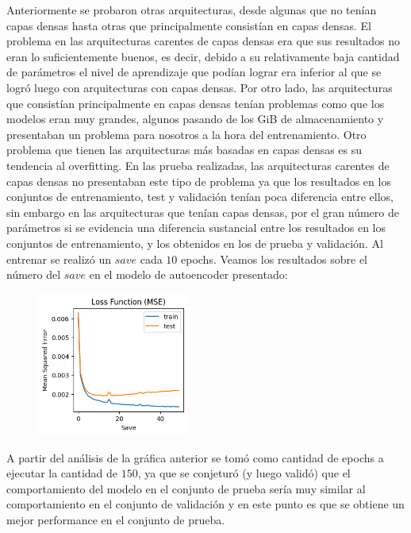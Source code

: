 \documentclass[colorinlistoftodos,twoside,twocolumn,10pt]{article} %
\begin{document}
Anteriormente se probaron otras arquitecturas, desde algunas que no tenían capas densas hasta otras que principalmente consistían en capas densas. El problema en las arquitecturas carentes de capas densas era que sus resultados no eran lo suficientemente buenos, es decir, debido a su relativamente baja cantidad de parámetros el nivel de aprendizaje que podían lograr era inferior al que se logró luego con arquitecturas con capas densas. Por otro lado, las arquitecturas que consistían principalmente en capas densas tenían problemas como que los modelos eran muy grandes, algunos pasando de los GiB de almacenamiento y presentaban un problema para nosotros a la hora del entrenamiento. Otro problema que tienen las arquitecturas más basadas en capas densas es su tendencia al overfitting. En las prueba realizadas, las arquitecturas carentes de capas densas no presentaban este tipo de problema ya que los resultados en los conjuntos de entrenamiento, test y validación tenían poca diferencia entre ellos, sin embargo en las arquitecturas que tenían capas densas, por el gran número de parámetros si se evidencia una diferencia sustancial entre los resultados en los conjuntos de entrenamiento, y los obtenidos en los de prueba y validación. Al entrenar se realizó un $save$ cada $10$ epochs. Veamos los resultados sobre el número del $save$ en el modelo de autoencoder presentado:

\begin{figure}[h!]
	\includegraphics[width=5cm]{overfitting_graph.png}
\end{figure}

A partir del análisis de la gráfica anterior se tomó como cantidad de epochs a ejecutar la cantidad de $150$, ya que se conjeturó (y luego validó) que el comportamiento del modelo en el conjunto de prueba sería muy similar al comportamiento en el conjunto de validación y en este punto es que se obtiene un mejor performance en el conjunto de prueba. 
\end{document}
